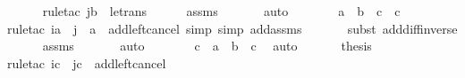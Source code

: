 \begin{isabellebody}
\ \ \ \ \ \isamarkupfalse%
{\isacharparenleft}{\kern0pt}rule{\isacharunderscore}{\kern0pt}tac\ j{\isacharequal}{\kern0pt}b\ \ le{\isacharunderscore}{\kern0pt}trans{\isacharparenright}{\kern0pt}\isanewline
\ \ \ \ \isamarkupfalse%
\ assms\ \isanewline
\ \ \ \ \isamarkupfalse%
\ auto\isanewline
\ \ \isamarkupfalse%
\ \isamarkupfalse%
\ {\isachardoublequoteopen}{\isachardot}{\kern0pt}{\isachardot}{\kern0pt}{\isachardot}{\kern0pt}\ {\isacharequal}{\kern0pt}\ a\ {\isacharhash}{\kern0pt}{\isacharplus}{\kern0pt}\ {\isacharparenleft}{\kern0pt}{\isacharparenleft}{\kern0pt}b\ {\isacharhash}{\kern0pt}{\isacharminus}{\kern0pt}\ c{\isacharparenright}{\kern0pt}\ {\isacharhash}{\kern0pt}{\isacharplus}{\kern0pt}\ c{\isacharparenright}{\kern0pt}{\isachardoublequoteclose}\ \isanewline
\ \ \ \ \isamarkupfalse%
{\isacharparenleft}{\kern0pt}rule{\isacharunderscore}{\kern0pt}tac\ i{\isacharequal}{\kern0pt}a\ \ j\ {\isacharequal}{\kern0pt}\ a\ \ add{\isacharunderscore}{\kern0pt}left{\isacharunderscore}{\kern0pt}cancel{\isacharcomma}{\kern0pt}\ simp{\isacharcomma}{\kern0pt}\ simp\ add{\isacharcolon}{\kern0pt}assms{\isacharparenright}{\kern0pt}\isanewline
\ \ \ \ \ \ \isamarkupfalse%
{\isacharparenleft}{\kern0pt}subst\ add{\isacharunderscore}{\kern0pt}diff{\isacharunderscore}{\kern0pt}inverse{}{\isacharparenright}{\kern0pt}\isanewline
\ \ \ \ \isamarkupfalse%
\ assms\ \isanewline
\ \ \ \ \isamarkupfalse%
\ auto\isanewline
\ \ \isamarkupfalse%
\ \isamarkupfalse%
\ {\isachardoublequoteopen}{\isachardot}{\kern0pt}{\isachardot}{\kern0pt}{\isachardot}{\kern0pt}\ {\isacharequal}{\kern0pt}\ c\ {\isacharhash}{\kern0pt}{\isacharplus}{\kern0pt}\ {\isacharparenleft}{\kern0pt}a\ {\isacharhash}{\kern0pt}{\isacharplus}{\kern0pt}\ {\isacharparenleft}{\kern0pt}b\ {\isacharhash}{\kern0pt}{\isacharminus}{\kern0pt}\ c{\isacharparenright}{\kern0pt}{\isacharparenright}{\kern0pt}{\isachardoublequoteclose}\ \isamarkupfalse%
\ auto\ \isanewline
\isanewline
\ \ \isamarkupfalse%
\ \isamarkupfalse%
\ {\isacharquery}{\kern0pt}thesis\ \isanewline
\ \ \ \ \isamarkupfalse%
{\isacharparenleft}{\kern0pt}rule{\isacharunderscore}{\kern0pt}tac\ i{\isacharequal}{\kern0pt}c\ \ j{\isacharequal}{\kern0pt}c\ \ add{\isacharunderscore}{\kern0pt}left{\isacharunderscore}{\kern0pt}cancel{\isacharparenright}{\kern0pt}\isanewline

\end{isabellebody}
